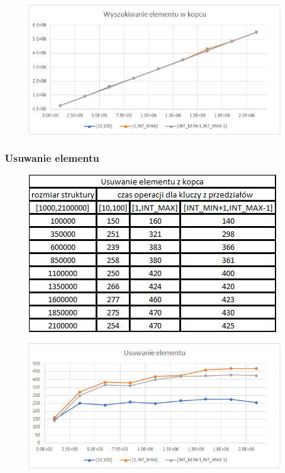 \documentclass{article}
\begin{document}
\begin{figure}[h!]
\includegraphics[width=11.3cm]{images/wyszukiwanie_kopiec_w.png}
\end{figure}

\newpage

\subsubsection*{Usuwanie elementu}
\begin{figure}[h!]

\includegraphics{images/usuwanie_kopiec.png}

\end{figure}

\begin{figure}[h!]
\includegraphics[width=11.3cm]{images/usuwanie_kopiec_w.png}
\end{figure}
\end{document}
